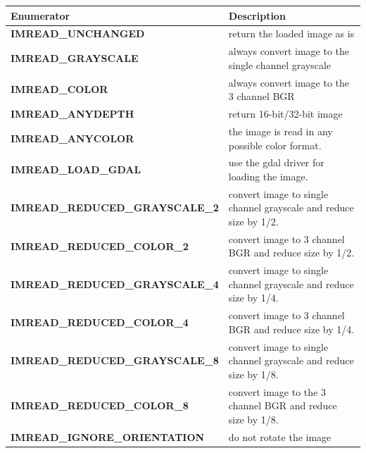 \documentclass{article}
\theoremstyle{definition}
\theoremstyle{remark}
\begin{document}
\begin{table}[h!]
    \centering
    \def\arraystretch{1.1}%
    \begin{tabular}{ p{5.8cm} p{7cm}} 
    \hline
    Enumerator &  Description \\
    \hline
    \textbf{\footnotesize{IMREAD\_UNCHANGED}} & return the loaded image as is\\

    \textbf{\footnotesize{IMREAD\_GRAYSCALE}} & always convert image to the single channel grayscale \\

    \textbf{\footnotesize{IMREAD\_COLOR}} & always convert image to the 3 channel BGR \\

    \textbf{\footnotesize{IMREAD\_ANYDEPTH}} & return 16-bit/32-bit image \\

    \textbf{\footnotesize{IMREAD\_ANYCOLOR}} & the image is read in any possible color format. \\

    \textbf{\footnotesize{IMREAD\_LOAD\_GDAL}} & use the gdal driver for loading the image. \\

    \textbf{\footnotesize{IMREAD\_REDUCED\_GRAYSCALE\_2}} &convert image to single channel grayscale and reduce size by 1/2. \\

    \textbf{\footnotesize{IMREAD\_REDUCED\_COLOR\_2}} &  convert image to 3 channel BGR and reduce size by 1/2. \\

    \textbf{\footnotesize{IMREAD\_REDUCED\_GRAYSCALE\_4}} & convert image to single channel grayscale and reduce size by 1/4. \\

    \textbf{\footnotesize{IMREAD\_REDUCED\_COLOR\_4}} & convert image to  3 channel BGR and reduce size by 1/4. \\

    \textbf{\footnotesize{IMREAD\_REDUCED\_GRAYSCALE\_8}} & convert image to single channel grayscale and reduce size by 1/8. \\

    \textbf{\footnotesize{IMREAD\_REDUCED\_COLOR\_8}} & convert image to the 3 channel BGR and reduce size by 1/8. \\

    \textbf{\footnotesize{IMREAD\_IGNORE\_ORIENTATION}} & do not rotate the image\\
    \hline
    \end{tabular}
\end{table}
\end{document}
